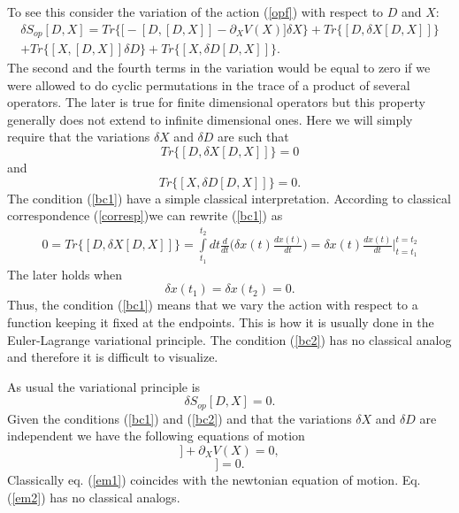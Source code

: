 \documentclass[a4paper,11pt]{article}
\begin{document}
To see this consider the variation of the action (\ref{opf}) with
respect to $D$ and $X$:
\begin{eqnarray}
\delta S_{op}[D,X]= Tr \bigg\{ \Big[ -[D,[D,X]] - \partial_X V(X)
\Big] \delta X \bigg\}+ Tr \Big\{  [D,\delta X[D,X]] \Big\}
\nonumber \\
+Tr \Big\{ [X,[D,X]]\delta D  \Big\}+ Tr \Big\{ [X,\delta D[D,X]]
\Big\}. \label{vari}
\end{eqnarray}
The second and the fourth terms in the variation would be equal to
zero if we were allowed to do cyclic permutations in the trace of
a product of several operators. The later is true for finite
dimensional operators but this property generally does not extend
to infinite dimensional ones. Here we will simply require that the
variations $\delta X$ and $\delta D$ are such that
\begin{equation}
Tr \Big\{  [D,\delta X[D,X]] \Big\}=0 \label{bc1}
\end{equation}
and
\begin{equation}
Tr \Big\{ [X,\delta D[D,X]] \Big\}=0. \label{bc2}
\end{equation}
The condition (\ref{bc1}) have a simple classical interpretation.
According to classical correspondence (\ref{corresp})we can
rewrite (\ref{bc1}) as
\begin{eqnarray}
0=Tr \Big\{  [D,\delta X[D,X]] \Big\} =\int\limits_{t_1}^{t_2} dt
\frac{d}{dt} \Big( \delta x(t) \frac{d x(t)}{dt} \Big) = \delta
x(t) \frac{d x(t)}{dt} \Big\vert_{t=t_1}^{t=t_2} \label{bc1cl}
\end{eqnarray}
The later holds when
\begin{equation}
\delta x(t_1)=\delta x(t_2)=0.
\end{equation}
Thus, the condition (\ref{bc1}) means that we vary the action with
respect to a function keeping it fixed at the endpoints. This is
how it is usually done in the Euler-Lagrange variational
principle. The condition (\ref{bc2}) has no classical analog and
therefore it is difficult to visualize.

As usual the variational principle is
\begin{equation}
\delta S_{op}[D,X]=0.
\end{equation}
Given the conditions (\ref{bc1}) and (\ref{bc2}) and that the
variations $\delta X$ and $\delta D$ are independent we have the
following equations of motion
\begin{equation}
[D,[D,X]] + \partial_X V(X)=0, \label{em1}
\end{equation}
\begin{equation}
[X,[D,X]]=0. \label{em2}
\end{equation}
Classically eq. (\ref{em1}) coincides with the newtonian equation
of motion. Eq. (\ref{em2}) has no classical analogs.
\end{document}
